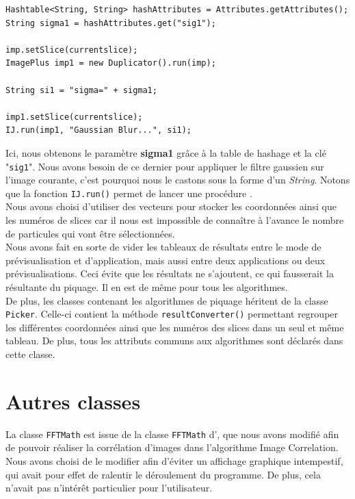 \begin{center}
\begin{fmpage}{16cm}
\begin{small}
\begin{lstlisting}
Hashtable<String, String> hashAttributes = Attributes.getAttributes();
String sigma1 = hashAttributes.get("sig1");

imp.setSlice(currentslice);
ImagePlus imp1 = new Duplicator().run(imp);

String si1 = "sigma=" + sigma1;

imp1.setSlice(currentslice);
IJ.run(imp1, "Gaussian Blur...", si1);
\end{lstlisting}
\end{small}
\end{fmpage}
\end{center}

Ici, nous obtenons le paramètre \textbf{sigma1} grâce à la table de hashage et la clé "\texttt{sig1}". Nous avons besoin de ce dernier pour appliquer le filtre gaussien sur l'image courante, c'est pourquoi nous le castons sous la forme d'un \emph{String}. Notons que la fonction \texttt{IJ.run()} permet de lancer une procédure \imj. \\

Nous avons choisi d'utiliser des vecteurs pour stocker les coordonnées ainsi que les numéros de slices car il nous est impossible de connaître à l'avance le nombre de particules qui vont être sélectionnées. \\
Nous avons fait en sorte de vider les tableaux de résultats entre le mode de prévisualisation et d'application, mais aussi entre deux applications ou deux prévisualisations. Ceci évite que les résultats ne s'ajoutent, ce qui fausserait la résultante du piquage. Il en est de même pour tous les algorithmes. \\

De plus, les classes contenant les algorithmes de piquage héritent de la classe \texttt{Picker}. Celle-ci contient la méthode \texttt{resultConverter()} permettant regrouper les différentes coordonnées ainsi que les numéros des slices dans un seul et même tableau. De plus, tous les attributs communs aux algorithmes sont déclarés dans cette classe. 

\section{Autres classes}

La classe \texttt{FFTMath} est issue de la classe \texttt{FFTMath} d'\imj, que nous avons modifié afin de pouvoir réaliser la corrélation d'images dans l'algorithme Image Correlation. Nous avons choisi de le modifier afin d'éviter un affichage graphique intempestif, qui avait pour effet de ralentir le déroulement du programme. De plus, cela n'avait pas n'intérêt particulier pour l'utilisateur. \\


